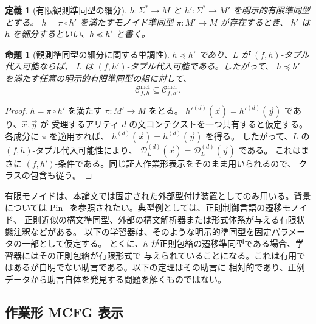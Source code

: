 \documentclass[11pt,a4paper]{ltjsarticle}
\newtheorem{proposition}[theorem]{命題}
\newtheorem{definition}[theorem]{定義}
\theoremstyle{remark}
\newcommand{\Cmcf}[2]{\mathcal{C}^{\mathrm{mcf}}_{#1,#2}}
\newcommand{\D}{\mathcal{D}}
\newcommand{\tuple}[1]{\vec{#1}}
\begin{document}
\begin{definition}[有限観測準同型の細分]
\label{def:h-refinement}
\(h\colon\Sigma^*\to M\) と \(h'\colon\Sigma^*\to M'\) を明示的有限準同型とする。
\(h=\pi\circ h'\) を満たすモノイド準同型 \(\pi\colon M'\to M\) が存在するとき、
\(h'\) は \(h\) を\emph{細分する}といい、\(h\preceq h'\) と書く。
\end{definition}

\begin{proposition}[観測準同型の細分に関する単調性]
\label{prop:h-refinement-monotonicity}
\(h\preceq h'\) であり、\(L\) が \((f,h)\)-タプル代入可能ならば、
\(L\) は \((f,h')\)-タプル代入可能である。したがって、
\(h\preceq h'\) を満たす任意の明示的有限準同型の組に対して、
\[
  \Cmcf{f}{h}\subseteq \Cmcf{f}{h'} .
\]
\end{proposition}

\begin{proof}
\(h=\pi\circ h'\) を満たす \(\pi\colon M'\to M\) をとる。
\(h'^{(d)}(\tuple x)=h'^{(d)}(\tuple y)\) であり、\(\tuple x,\tuple y\) が
受理するアリティ \(d\) の文コンテクストを一つ共有すると仮定する。
各成分に \(\pi\) を適用すれば、
\(h^{(d)}(\tuple x)=h^{(d)}(\tuple y)\) を得る。
したがって、\(L\) の \((f,h)\)-タプル代入可能性により、
\(\D_L^{(d)}(\tuple x)=\D_L^{(d)}(\tuple y)\) である。
これはまさに \((f,h')\)-条件である。同じ証人作業形表示をそのまま用いられるので、
クラスの包含も従う。
\end{proof}

有限モノイドは、本論文では固定された外部型付け装置としてのみ用いる。背景については
Pin~\cite{Pin1986} を参照されたい。典型例としては、正則制御言語の遷移モノイド、
正則近似の構文準同型、外部の構文解析器または形式体系が与える有限状態注釈などがある。
以下の学習器は、そのような明示的準同型を固定パラメータの一部として仮定する。
とくに、\(h\) が正則包絡の遷移準同型である場合、学習器にはその正則包絡が有限形式で
与えられていることになる。これは有用ではあるが自明でない助言である。以下の定理はその助言に
相対的であり、正例データから助言自体を発見する問題を解くものではない。

\subsection{作業形 MCFG 表示}
\end{document}
